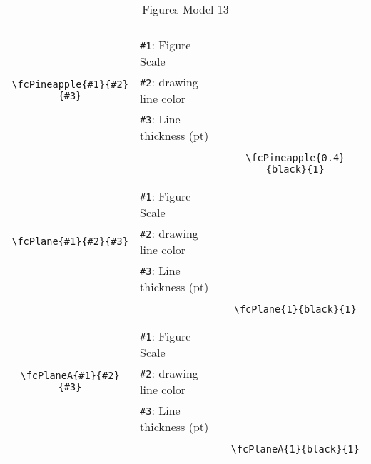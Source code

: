 \documentclass[x11names]{article}
\begin{document}
\begin{table}[H]
\begin{tabular}{|c|l|c|}
	&&\multirow{5}{*}{\fcPineapple{0.4}{black}{1}}\\	&&\\	&\verb|#1|: Figure Scale &\\	\verb|\fcPineapple{#1}{#2}{#3}|&	\verb|#2|: drawing line color &\\	&\verb|#3|: Line thickness (pt) &\\ &&\\&&	\verb|\fcPineapple{0.4}{black}{1}|\\\hline 	
	&&\multirow{5}{*}{\fcPlane{1}{black}{1}}\\	&&\\	&\verb|#1|: Figure Scale &\\	\verb|\fcPlane{#1}{#2}{#3}|&	\verb|#2|: drawing line color &\\	&\verb|#3|: Line thickness (pt) &\\ &&\\&&	\verb|\fcPlane{1}{black}{1}|\\\hline 	
	&&\multirow{5}{*}{\fcPlaneA{1}{black}{1}}\\	&&\\	&\verb|#1|: Figure Scale &\\	\verb|\fcPlaneA{#1}{#2}{#3}|&	\verb|#2|: drawing line color &\\	&\verb|#3|: Line thickness (pt) &\\ &&\\&&	\verb|\fcPlaneA{1}{black}{1}|\\\hline 	\hline\end{tabular}\caption{Figures Model 13}\label{tab13}\end{table}
\end{document}
